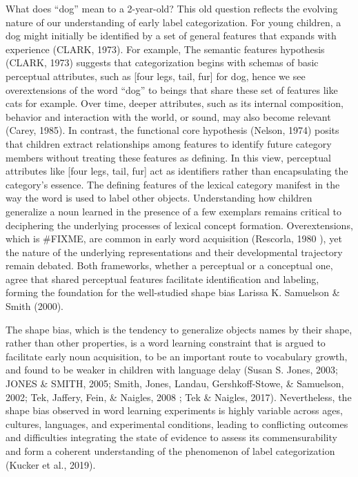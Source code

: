 \documentclass[10pt, letterpaper]{article}
\begin{document}
What does ``dog'' mean to a 2-year-old? This old question reflects the
evolving nature of our understanding of early label categorization. For
young children, a dog might initially be identified by a set of general
features that expands with experience (CLARK, 1973). For example, The
semantic features hypothesis (CLARK, 1973) suggests that categorization
begins with schemas of basic perceptual attributes, such as {[}four
legs, tail, fur{]} for dog, hence we see overextensions of the word
``dog'' to beings that share these set of features like cats for
example. Over time, deeper attributes, such as its internal composition,
behavior and interaction with the world, or sound, may also become
relevant (Carey, 1985). In contrast, the functional core hypothesis
(Nelson, 1974) posits that children extract relationships among features
to identify future category members without treating these features as
defining. In this view, perceptual attributes like {[}four legs, tail,
fur{]} act as identifiers rather than encapsulating the category's
essence. The defining features of the lexical category manifest in the
way the word is used to label other objects. Understanding how children
generalize a noun learned in the presence of a few exemplars remains
critical to deciphering the underlying processes of lexical concept
formation. Overextensions, which is \#FIXME, are common in early word
acquisition (Rescorla, 1980 ), yet the nature of the underlying
representations and their developmental trajectory remain debated. Both
frameworks, whether a perceptual or a conceptual one, agree that shared
perceptual features facilitate identification and labeling, forming the
foundation for the well-studied shape bias Larissa K. Samuelson \& Smith
(2000).

The shape bias, which is the tendency to generalize objects names by
their shape, rather than other properties, is a word learning constraint
that is argued to facilitate early noun acquisition, to be an important
route to vocabulary growth, and found to be weaker in children with
language delay (Susan S. Jones, 2003; JONES \& SMITH, 2005; Smith,
Jones, Landau, Gershkoff-Stowe, \& Samuelson, 2002; Tek, Jaffery, Fein,
\& Naigles, 2008 ; Tek \& Naigles, 2017). Nevertheless, the shape bias
observed in word learning experiments is highly variable across ages,
cultures, languages, and experimental conditions, leading to conflicting
outcomes and difficulties integrating the state of evidence to assess
its commensurability and form a coherent understanding of the phenomenon
of label categorization (Kucker et al., 2019).
\end{document}
